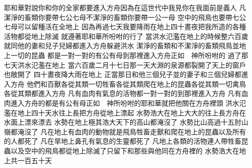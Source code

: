 \bchapter%
耶和華對說\chientien 你和你的全家都要進入方舟\chientien 因為在這世代中\chientien 我見你在我面前是義人\chuan 
{}凡潔淨的畜類\chientien 你要帶七公七母\yuentien 不潔淨的畜類\chientien 你要帶一公一母\yuentien 
{}空中的飛鳥\chientien 也要帶七公七母\chientien 可以留種\chientien 活在全地上\chientien 
{}因為再過七天\chientien 我要降雨在地上四十晝夜\chientien 把我所造的各種活物\chientien 都從地上除滅\chuan 
{}就遵著耶和華所吩咐的行了\chuan\Chuan
{}當洪水氾濫在地上的時候\chientien{}整六百歲\chuan 
{}就同他的妻\chientien 和兒子\chientien 兒婦\chientien 都進入方舟\chientien 躲避洪水\chuan 
{}潔淨的畜類\chientien 和不潔淨的畜類\chientien 飛鳥並地上一切的昆蟲\chientien 
{}都是一對一對的\chientien 有公有母\chientien 到那裡進入方舟\chientien 正如　神所吩咐的\chuan 
{}過了那七天\chientien 洪水氾濫在地上\chuan 
{}當六百歲\chientien 二月十七日那一天\chientien 大淵的泉源\chientien 都裂開了\chientien 天上的窗戶\chientien 也敞開了\chuan 
{}四十晝夜降大雨在地上\chuan\Chuan
{}正當那日\chientien {}和他三個兒子\chientien{}\chientien{}\chientien 並的妻子\chientien 和三個兒婦\chientien 都進入方舟\chuan 
{}他們和百獸\chientien 各從其類\chientien 一切牲畜\chientien 各從其類\chientien 爬在地上的昆蟲\chientien 各從其類\chientien 一切禽鳥\chientien 各從其類\chientien 都進入方舟\chuan 
{}凡有血肉\chientien 有氣息的活物\chientien 都一對一對的到那裡\chientien 進入方舟\chuan 
{}凡有血肉進入方舟的\chientien 都是有公有母\chientien 正如　神所吩咐的\yuentien 耶和華就把他關在方舟裡頭\chuan 
{}洪水氾濫在地上四十天\chientien 水往上長\chientien 把方舟從地上漂起\chuan 
{}水勢浩大\chientien 在地上大大的往上長\chientien 方舟在水面上漂來漂去\chuan 
{}水勢在地上極其浩大\chientien 天下的高山都淹沒了\chuan 
{}水勢比山高過十五肘\chientien 山嶺都淹沒了\chuan 
{}凡在地上有血肉的動物\chientien 就是飛鳥\chientien 牲畜\chientien 走獸\chientien 和爬在地上的昆蟲\chientien 以及所有的人都死了\chuan 
{}凡在旱地上\chientien 鼻孔有氣息的生靈都死了\chuan 
{}凡地上各類的活物\chientien 連人帶牲畜\chientien 昆蟲\chientien 以及空中的飛鳥\chientien 都從地上除滅了\chientien 只留下和那些與他同在方舟裡的\chuan 
{}水勢浩大\chientien 在地上共一百五十天\chuan 

